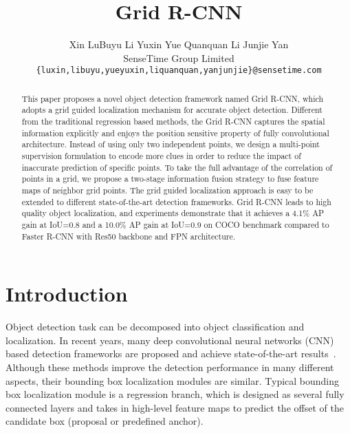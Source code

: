 \documentclass[10pt,twocolumn,letterpaper]{article}
\begin{document}
\title{Grid R-CNN}

\author{Xin Lu\quad Buyu Li \quad Yuxin Yue \quad Quanquan Li \quad Junjie Yan \\
SenseTime Group Limited\\
{\tt\small \{luxin,libuyu,yueyuxin,liquanquan,yanjunjie\}@sensetime.com} \\
}
\maketitle

\begin{abstract}
This paper proposes a novel object detection framework named Grid R-CNN, which adopts a grid guided localization mechanism for accurate object detection. Different from the traditional regression based methods, the Grid R-CNN captures the spatial information explicitly and enjoys the position sensitive property of fully convolutional architecture. Instead of using only two independent points, we design a multi-point supervision formulation to encode more clues in order to reduce the impact of inaccurate prediction of specific points. To take the full advantage of the correlation of points in a grid, we propose a two-stage information fusion strategy to fuse feature maps of neighbor grid points. The grid guided localization approach is easy to be extended to different state-of-the-art detection frameworks. Grid R-CNN leads to high quality object localization, and experiments demonstrate that it achieves a 4.1\% AP gain at IoU=0.8 and a 10.0\% AP gain at IoU=0.9 on COCO benchmark compared to Faster R-CNN with Res50 backbone and FPN architecture.


\end{abstract}

\section{Introduction}
\label{sec:intro}

Object detection task can be decomposed into object classification and localization. In recent years, many deep convolutional neural networks (CNN) based detection frameworks are proposed and achieve state-of-the-art results~\cite{girshick2014rich,girshick2015fast,ren2015faster,lin2017feature,he2017mask,cai2017cascade}. Although these methods improve the detection performance in many different aspects, their bounding box localization modules are similar. Typical bounding box localization module is a regression branch, which is designed as several fully connected layers and takes in high-level feature maps to predict the offset of the candidate box (proposal or predefined anchor). 
\end{document}
